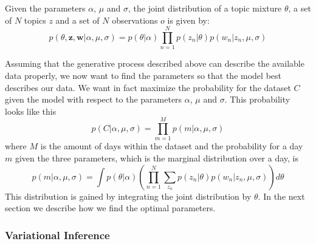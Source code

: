 \documentclass[11pt,a4paper]{article}
\begin{document}
Given the parameters $\alpha$, $\mu$ and $\sigma$, the joint distribution of a topic mixture $\theta$, a set of $N$ topics $z$ and a set of $N$ observations $o$ is given by:
\begin{equation}
 p(\theta,\textbf{z},\textbf{w}|\alpha,\mu,\sigma) = p(\theta|\alpha) \prod_{n=1}^N p(z_n|\theta) p(w_n|z_n,\mu,\sigma)
\end{equation}


%
%
%

  
Assuming that the generative process described above can describe the available data properly, we now want to find the parameters so that the model best describes our data. We want in fact maximize the probability for the dataset $C$ given the model with respect to the parameters $\alpha$, $\mu$ and $\sigma$. This probability looks like this
\begin{equation}
p(C|\alpha,\mu,\sigma) = \prod_{m=1}^M p(m|\alpha,\mu,\sigma)
\end{equation}
where $M$ is the amount of days within the dataset and the probability for a day $m$ given the three parameters, which is the marginal distribution over a day, is
\begin{equation} 
p(m|\alpha,\mu,\sigma) = \int p(\theta|\alpha)  \left( \prod_{n=1}^N \sum_{z_n} p(z_n|\theta) p(w_n|z_n, \mu,\sigma)  \right) d\theta
\end{equation}
This distribution is gained by integrating the joint distribution by $\theta$.
In the next section we describe how we find the optimal parameters.



  
\subsubsection{Variational Inference}
 
\end{document}
